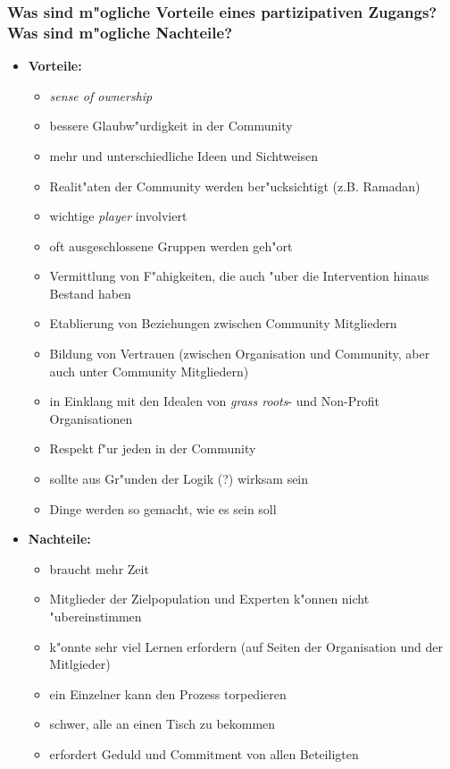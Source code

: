 \subsubsection{Was sind m"ogliche Vorteile eines partizipativen Zugangs? Was sind m"ogliche Nachteile?}
\begin{itemize}
        \item \textbf{Vorteile:}
                \begin{itemize}
                        \item \emph{sense of ownership}
                        \item bessere Glaubw"urdigkeit in der Community
                        \item mehr und unterschiedliche Ideen und Sichtweisen
                        \item Realit"aten der Community werden ber"ucksichtigt (z.B. Ramadan)
                        \item wichtige \emph{player} involviert
                        \item oft ausgeschlossene Gruppen werden geh"ort
                        \item Vermittlung von F"ahigkeiten, die auch "uber die Intervention hinaus Bestand haben
                        \item Etablierung von Beziehungen zwischen Community Mitgliedern
                        \item Bildung von Vertrauen (zwischen Organisation und Community, aber auch unter Community Mitgliedern)
                        \item in Einklang mit den Idealen von \emph{grass roots}- und Non-Profit Organisationen
                        \item Respekt f"ur jeden in der Community
                        \item sollte aus Gr"unden der Logik (?) wirksam sein
                        \item Dinge werden so gemacht, wie es sein soll
                \end{itemize}
        \item \textbf{Nachteile:}
                \begin{itemize}
                        \item braucht mehr Zeit
                        \item Mitglieder der Zielpopulation und Experten k"onnen nicht "ubereinstimmen
                        \item k"onnte sehr viel Lernen erfordern (auf Seiten der Organisation und der Mitlgieder)
                        \item ein Einzelner kann den Prozess torpedieren
                        \item schwer, alle an einen Tisch zu bekommen
                        \item erfordert Geduld und Commitment von allen Beteiligten
                \end{itemize}
\end{itemize}

